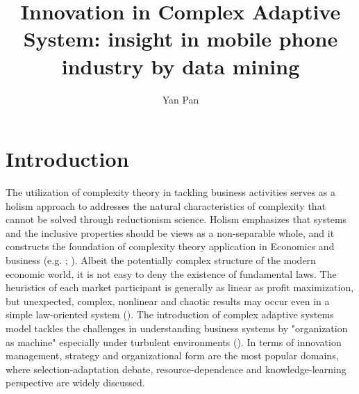 \documentclass[utf8,english]{gradu3}
\begin{document}
\title{Innovation in Complex Adaptive System: insight in mobile phone industry by data mining}
\author{Yan Pan}

\maketitle

\mainmatter

\chapter{Introduction}

The utilization of complexity theory in tackling business activities serves as a holism approach to addresses the natural characteristics of complexity that cannot be solved through reductionism science. Holism emphasizes that systems and the inclusive properties should be views as a non-separable whole, and it constructs the foundation of complexity theory application in Economics and business (e.g. \cite{smuts1926holism}; \cite{auyang1999foundations}).  Albeit the potentially complex structure of the modern economic world, it is not easy to deny the existence of fundamental laws. The heuristics of each market participant is generally as linear as profit maximization, but unexpected, complex, nonlinear and chaotic results may occur even in a simple law-oriented system (\cite{nicolis1995introduction}). The introduction of complex adaptive systems model tackles the challenges in understanding business systems by "organization as machine" especially under turbulent environments (\cite{dooley1997complex}). In terms of innovation management, strategy and organizational form are the most popular domains, where selection-adaptation debate, resource-dependence and knowledge-learning perspective are widely discussed. 
\end{document}
